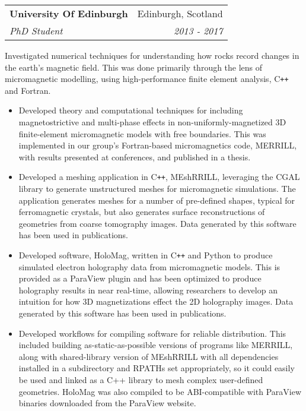 \documentclass[11pt]{article}
\makeatletter
\newenvironment{resumeSubSectionHeader}{
    \par
    \begin{tabular*}{\textwidth}{l@{\extracolsep{\fill}}r}
    \par
} {
    \end{tabular*}
    \par
}
\newenvironment{resumeSubSectionBody}{
    \par
    \vspace{-0.4\parskip}
    \begin{small}
    \par
} {
    \par
    \end{small}
    \par
}
\newenvironment{resumeItemize}{
    \vspace{-0.5\baselineskip}
    \begin{itemize}
} {
    \end{itemize}
}
\makeatother
\begin{document}
%
%
\begin{resumeSubSectionHeader}

    \textbf{University Of Edinburgh}   & Edinburgh, Scotland \\
    \emph{PhD Student}                 & \emph{2013 - 2017}

\end{resumeSubSectionHeader}
\begin{resumeSubSectionBody}

    Investigated numerical techniques for understanding how rocks record
    changes in the earth's magnetic field. This was done primarily through
    the lens of micromagnetic modelling, using high-performance finite element
    analysis, C\verb!++! and Fortran.

    \begin{resumeItemize}
        \item
            Developed theory and computational techniques for including
            magnetostrictive and multi-phase effects in non-uniformly-magnetized
            3D finite-element micromagnetic models with free boundaries.  This
            was implemented in our group's Fortran-based micromagnetics code,
            MERRILL, with results presented at conferences, and published in a
            thesis.

        \item
            Developed a meshing application in C\verb!++!, MEshRRILL, leveraging
            the CGAL library to generate unstructured meshes for micromagnetic
            simulations.
            The application generates meshes for a number of pre-defined shapes,
            typical for ferromagnetic crystals, but also generates
            surface reconstructions of geometries from coarse tomography images.
            Data generated by this software has been used in publications.

        \item
            Developed software, HoloMag, written in C\verb!++! and Python to
            produce simulated electron holography data from micromagnetic
            models.
            This is provided as a ParaView plugin and has been optimized to
            produce holography results in near real-time, allowing researchers
            to develop an intuition for how 3D magnetizations effect the 2D
            holography images.
            Data generated by this software has been used in publications.

        \item
            Developed workflows for compiling software for reliable
            distribution.
            This included building as-static-as-possible versions of programs
            like MERRILL, along with shared-library version of MEshRRILL with
            all dependencies installed in a subdirectory and RPATHs set
            appropriately, so it could easily be used and linked as a C++
            library to mesh complex user-defined geometries.
            HoloMag was also compiled to be ABI-compatible with ParaView
            binaries downloaded from the ParaView website.
    \end{resumeItemize}


\end{resumeSubSectionBody}
\end{document}
